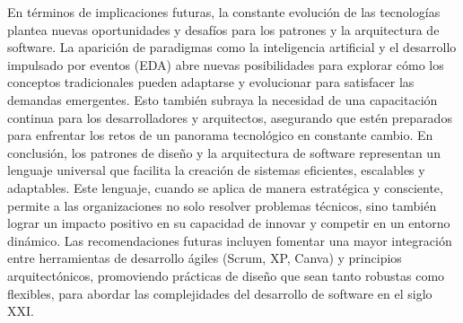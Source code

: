 \documentclass[conference]{IEEEtran}
\begin{document}
En términos de implicaciones futuras, la constante evolución de las tecnologías plantea nuevas oportunidades y desafíos para los patrones y la arquitectura de software. La aparición de paradigmas como la inteligencia artificial y el desarrollo impulsado por eventos (EDA) abre nuevas posibilidades para explorar cómo los conceptos tradicionales pueden adaptarse y evolucionar para satisfacer las demandas emergentes. Esto también subraya la necesidad de una capacitación continua para los desarrolladores y arquitectos, asegurando que estén preparados para enfrentar los retos de un panorama tecnológico en constante cambio.
En conclusión, los patrones de diseño y la arquitectura de software representan un lenguaje universal que facilita la creación de sistemas eficientes, escalables y adaptables. Este lenguaje, cuando se aplica de manera estratégica y consciente, permite a las organizaciones no solo resolver problemas técnicos, sino también lograr un impacto positivo en su capacidad de innovar y competir en un entorno dinámico. Las recomendaciones futuras incluyen fomentar una mayor integración entre herramientas de desarrollo ágiles (Scrum, XP, Canva) y principios arquitectónicos, promoviendo prácticas de diseño que sean tanto robustas como flexibles, para abordar las complejidades del desarrollo de software en el siglo XXI.
\end{document}

